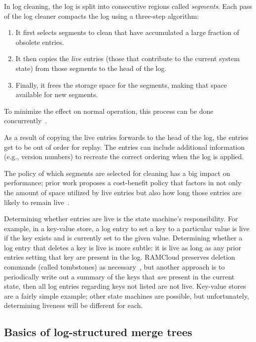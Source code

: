 In log cleaning, the log is split into consecutive regions called
\emph{segments}. Each pass of the log cleaner compacts the log using a
three-step algorithm:
%
\begin{enumerate}
%
\item It first selects segments to clean that have accumulated a large
fraction of obsolete entries.
%
\item It then copies the \emph{live} entries (those that contribute to
the current system state) from those segments to the head of the log.
%
\item Finally, it frees the storage space for the segments, making
that space available for new segments.
%
\end{enumerate}
%
To minimize the effect on normal operation, this process can be done
concurrently~\cite{Rumble:2014}.

As a result of copying the live entries forwards to the head of the log,
the entries get to be out of order for replay. The entries can include
additional information (e.g., version numbers) to recreate the correct
ordering when the log is applied.

The policy of which segments are selected for cleaning has a big impact
on performance; prior work proposes a cost-benefit policy that factors
in not only the amount of space utilized by live entries but also how
long those entries are likely to remain
live~\cite{Rosenblum:1992,Rumble:2014}.

Determining whether entries are live is the state machine's
responsibility. For example, in a key-value store, a log entry to set a
key to a particular value is live if the key exists and is currently set
to the given value. Determining whether a log entry that deletes a key
is live is more subtle: it is live as long as any prior entries setting that key
are present in the log. RAMCloud
preserves deletion commands (called tombstones) as
necessary~\cite{Rumble:2014}, but another approach is to periodically write
out a summary of the keys that
\emph{are} present in the current state, then all log entries regarding
keys not listed are not live. Key-value stores are a fairly simple
example; other state machines are possible, but unfortunately,
determining liveness will be different for each.

\subsection{Basics of log-structured merge trees}
\label{compaction:incremental:lsmtrees}


